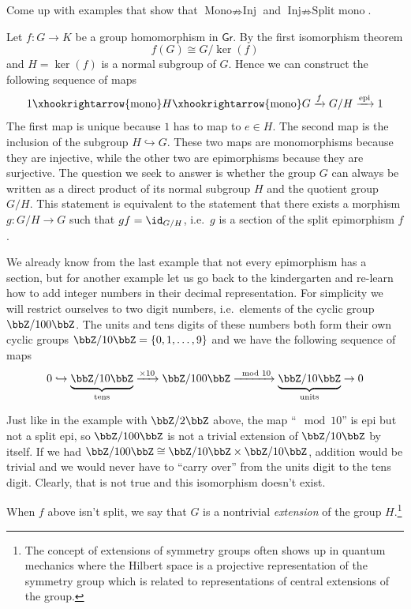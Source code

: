\begin{xca}
Come up with examples that show that $\text{Mono}\nRightarrow\text{Inj}$
and $\text{Inj}\nRightarrow\text{Split mono}$.
\end{xca}
\begin{example}
 Let $f:G\rightarrow K$ be a group homomorphism in $\mathsf{Gr}$.
By the first isomorphism theorem 
\begin{equation}
f(G)\cong G/\ker(f)
\end{equation}
and $H=\ker(f)$ is a normal subgroup of $G$. Hence we can construct
the following sequence of maps
\begin{equation}
1\xhookrightarrow{\text{mono}}H\xhookrightarrow{\text{mono}}G\xrightarrow{f}G/H\xrightarrow{\text{epi}}1
\end{equation}
The first map is unique because $1$ has to map to $e\in H$. The second map is the inclusion of the subgroup $H\hookrightarrow G$. These two maps are monomorphisms because they are injective, while
the other two are epimorphisms because they are surjective. The question
we seek to answer is whether the group $G$ can always be written as
a direct product of its normal subgroup $H$ and the quotient group $G/H$.
This statement is equivalent to the statement that there exists a morphism
$g:G/H\rightarrow G$ such that $gf=\id_{G/H}$, i.e.\ $g$ is a section
of the split epimorphism $f$. 

We already know from the last example that not every epimorphism has a section, but for another example let us go back to the kindergarten and
re-learn how to add integer numbers in their decimal representation. For simplicity we will restrict ourselves
to two digit numbers, i.e.\ elements of the cyclic group $\bbZ/100\bbZ$.
The units and tens digits of these numbers both form their own cyclic
groups $\bbZ/10\bbZ=\{0,1,\ldots,9\}$ and we have the following
sequence of maps 
\begin{equation}
0\hookrightarrow\underbrace{\bbZ/10\bbZ}_\text{tens}\xrightarrow{\times10}\bbZ/100\bbZ\xrightarrow{\mod 10}\underbrace{\bbZ/10\bbZ}_\text{units}\rightarrow0
\end{equation}

Just like in the example with $\bbZ/2\bbZ$ above, the map ``$\mod 10$'' is epi but not a split epi, so $\bbZ/100\bbZ$ is not a trivial extension of $\bbZ/10\bbZ$ by itself. If we had $\bbZ/100\bbZ\cong\bbZ/10\bbZ\times\bbZ/10\bbZ$,
addition would be trivial and we would never have to ``carry over''
from the units digit to the tens digit. Clearly, that is not true
and this isomorphism doesn't exist. 

When $f$ above isn't split, we say that $G$ is a nontrivial \emph{extension}
of the group $H$.\footnote{The concept of extensions of symmetry groups often shows up in quantum
mechanics where the Hilbert space is a projective representation of
the symmetry group which is related to representations of central
extensions of the group.}
\end{example}



